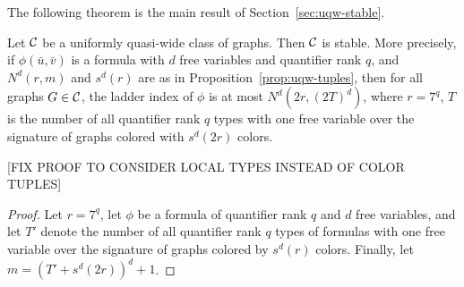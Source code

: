 The following theorem is the main result of Section~\ref{sec:uqw-stable}.


\begin{theorem}\label{thm:uqw-stable}
	Let $\cal C$ be a uniformly quasi-wide class of graphs.
	Then $\cal C$ is stable. More precisely, if $\phi(\bar u,\bar v)$ is a formula with $d$ free variables and quantifier rank $q$, and $N^d(r,m)$ and $s^d(r)$ are as in Proposition~\ref{prop:uqw-tuples}, then for all graphs $G\in\cal C$,  the ladder index of $\phi$ is at most $N^d(2r,(2T)^d)$,
where $r= 7^q$,
 $T$ is the number of all quantifier rank $q$ types with one free  variable over the signature of  graphs colored with $s^d(2r)$ colors.
\end{theorem}
[FIX PROOF TO CONSIDER LOCAL TYPES INSTEAD OF COLOR TUPLES]
\begin{proof}
Let $r=  7^q$, 
let $\phi$ be a formula of quantifier rank $q$ and $d$ free variables,
and let $T'$ denote the number of all quantifier rank $q$ types of 
formulas with one free variable over the signature of  graphs colored by $s^d(r)$ colors.
Finally, let $m=(T'+s^d(2r))^d+1$. 


\end{proof}
